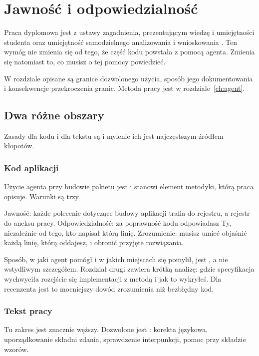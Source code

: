 \chapter{Jawność i odpowiedzialność}\label{ch:etyka}

Praca dyplomowa jest z ustawy  zagadnienia, prezentującym wiedzę i umiejętności studenta oraz umiejętność samodzielnego analizowania i wnioskowania \parencite{prawoSzkolnictwo}. Ten wymóg nie zmienia się od tego, że część kodu powstała z pomocą agenta. Zmienia się natomiast to, co musisz o tej pomocy powiedzieć.

W rozdziale opisane są granice dozwolonego użycia, sposób jego dokumentowania i konsekwencje przekroczenia granic. Metoda pracy jest w rozdziale~\ref{ch:agent}.

\section{Dwa różne obszary}

Zasady dla kodu i dla tekstu są  i mylenie ich jest najczęstszym źródłem kłopotów.

\subsection{Kod aplikacji}

Użycie agenta przy budowie pakietu jest  i stanowi element metodyki, którą praca opisuje. Warunki są trzy.

Jawność: każde polecenie dotyczące budowy aplikacji trafia do rejestru, a rejestr do aneksu pracy. Odpowiedzialność: za poprawność kodu odpowiadasz Ty, niezależnie od tego, kto napisał którą linię. Zrozumienie: musisz umieć objaśnić każdą linię, którą oddajesz, i obronić przyjęte rozwiązania.

Sposób, w jaki agent pomógł i w jakich miejscach się pomylił, jest , a nie wstydliwym szczegółem. Rozdział drugi zawiera krótką analizę: gdzie specyfikacja wychwyciła rozejście się implementacji z metodą i jak to wykryłeś. Dla recenzenta jest to mocniejszy dowód zrozumienia niż bezbłędny kod.

\subsection{Tekst pracy}

Tu zakres jest znacznie węższy. Dozwolone jest : korekta językowa, uporządkowanie składni zdania, sprawdzenie interpunkcji, pomoc przy składzie wzorów.

